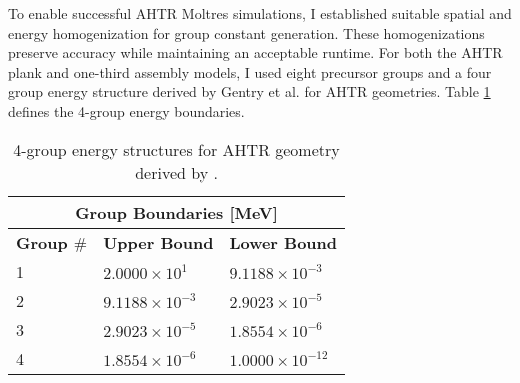 To enable successful \gls{AHTR} Moltres simulations, I established suitable spatial and 
energy homogenization for group constant generation. 
These homogenizations preserve accuracy while maintaining an acceptable runtime.
For both the \gls{AHTR} plank and one-third assembly models, I used eight precursor groups 
and a four group energy structure derived by Gentry et al. \cite{gentry_development_2016} 
for \gls{AHTR} geometries. 
Table \ref{tab:energy_structures} defines the 4-group energy boundaries. 
\begin{table}[htbp]
    \centering
    \onehalfspacing
    \caption{4-group energy structures for \acrfull{AHTR} geometry 
    derived by \cite{gentry_development_2016}.}
	\label{tab:energy_structures}
    \footnotesize
    \begin{tabular}{lll}
    \hline
    \multicolumn{3}{c}{\textbf{Group Boundaries [MeV]}} \\ 
    \hline
    \textbf{Group $\#$}& \textbf{Upper Bound} & \textbf{Lower Bound}  \\
    \hline 
    1 & $2.0000\times 10^1$ & $9.1188\times 10^{-3}$ \\ 
    2 & $9.1188\times 10^{-3}$ & $2.9023\times 10^{-5}$\\
    3 & $2.9023\times 10^{-5}$ & $1.8554\times 10^{-6}$\\
    4 & $1.8554\times 10^{-6}$ & $1.0000\times 10^{-12}$\\
    \hline
    \end{tabular}
\end{table}

